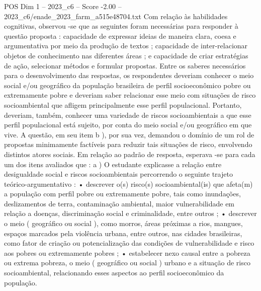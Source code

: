 \begin{textsample}{POS Dim 1 – 2023\_c6 – Score -2.00 – 2023\_c6/enade\_2023\_farm\_a515e48704.txt}
Com relação às habilidades cognitivas, observou -se que as seguintes foram necessárias para responder à questão proposta : capacidade de expressar ideias de maneira clara, coesa e argumentativa por meio da produção de textos ; capacidade de inter-relacionar objetos de conhecimento nas diferentes áreas ; e capacidade de criar estratégias de ação, selecionar métodos e formular propostas.
Entre os saberes necessários para o desenvolvimento das respostas, os respondentes deveriam conhecer o meio social e/ou geográfico da população brasileira de perfil socioeconômico pobre ou extremamente pobre e deveriam saber relacionar esse meio com situações de risco socioambiental que afligem principalmente esse perfil populacional.
Portanto, deveriam, também, conhecer uma variedade de riscos socioambientais a que esse perfil populacional está sujeito, por conta do meio social e/ou geográfico em que vive.
A questão, em seu item b ), por sua vez, demandou o domínio de um rol de propostas minimamente factíveis para reduzir tais situações de risco, envolvendo distintos atores sociais.
Em relação ao padrão de resposta, esperava -se para cada um dos itens avaliados que : a ) O estudante explicasse a relação entre desigualdade social e riscos socioambientais percorrendo o seguinte trajeto teórico-argumentativo : • descrever o(s) risco(s) socioambiental(is) que afeta(m) a população com perfil pobre ou extremamente pobre, tais como inundações, deslizamentos de terra, contaminação ambiental, maior vulnerabilidade em relação a doenças, discriminação social e criminalidade, entre outros ; • descrever o meio ( geográfico ou social ), como morros, áreas próximas a rios, mangues, espaços marcados pela violência urbana, entre outros, nas cidades brasileiras, como fator de criação ou potencialização das condições de vulnerabilidade e risco aos pobres ou extremamente pobres ; • estabelecer nexo causal entre a pobreza ou extrema pobreza, o meio ( geográfico ou social ) urbano e a situação de risco socioambiental, relacionando esses aspectos ao perfil socioeconômico da população.

\end{textsample}

